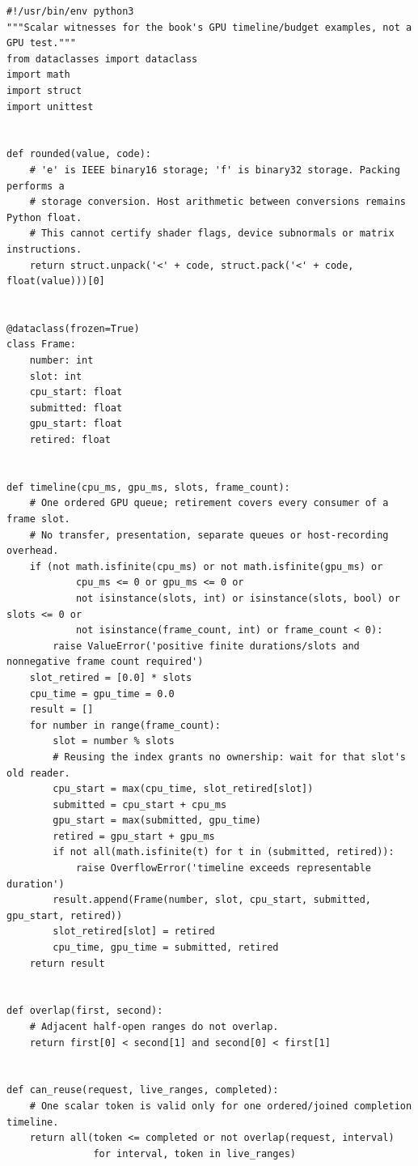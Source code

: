 \begin{verbatim}
#!/usr/bin/env python3
"""Scalar witnesses for the book's GPU timeline/budget examples, not a GPU test."""
from dataclasses import dataclass
import math
import struct
import unittest


def rounded(value, code):
    # 'e' is IEEE binary16 storage; 'f' is binary32 storage. Packing performs a
    # storage conversion. Host arithmetic between conversions remains Python float.
    # This cannot certify shader flags, device subnormals or matrix instructions.
    return struct.unpack('<' + code, struct.pack('<' + code, float(value)))[0]


@dataclass(frozen=True)
class Frame:
    number: int
    slot: int
    cpu_start: float
    submitted: float
    gpu_start: float
    retired: float


def timeline(cpu_ms, gpu_ms, slots, frame_count):
    # One ordered GPU queue; retirement covers every consumer of a frame slot.
    # No transfer, presentation, separate queues or host-recording overhead.
    if (not math.isfinite(cpu_ms) or not math.isfinite(gpu_ms) or
            cpu_ms <= 0 or gpu_ms <= 0 or
            not isinstance(slots, int) or isinstance(slots, bool) or slots <= 0 or
            not isinstance(frame_count, int) or frame_count < 0):
        raise ValueError('positive finite durations/slots and nonnegative frame count required')
    slot_retired = [0.0] * slots
    cpu_time = gpu_time = 0.0
    result = []
    for number in range(frame_count):
        slot = number % slots
        # Reusing the index grants no ownership: wait for that slot's old reader.
        cpu_start = max(cpu_time, slot_retired[slot])
        submitted = cpu_start + cpu_ms
        gpu_start = max(submitted, gpu_time)
        retired = gpu_start + gpu_ms
        if not all(math.isfinite(t) for t in (submitted, retired)):
            raise OverflowError('timeline exceeds representable duration')
        result.append(Frame(number, slot, cpu_start, submitted, gpu_start, retired))
        slot_retired[slot] = retired
        cpu_time, gpu_time = submitted, retired
    return result


def overlap(first, second):
    # Adjacent half-open ranges do not overlap.
    return first[0] < second[1] and second[0] < first[1]


def can_reuse(request, live_ranges, completed):
    # One scalar token is valid only for one ordered/joined completion timeline.
    return all(token <= completed or not overlap(request, interval)
               for interval, token in live_ranges)



\end{verbatim}
